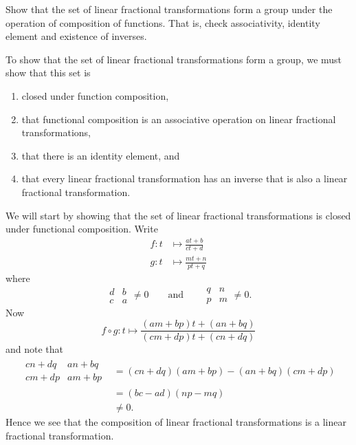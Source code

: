 \documentclass{ximera}
\begin{document}
\begin{problem}
Show that the set of linear fractional transformations form a group
under the operation of composition of functions. That is, check
associativity, identity element and existence of inverses.
\begin{freeResponse}
To show that the set of linear fractional transformations form a group, we must show that this set is 
\begin{enumerate}
\item closed under function composition, 
\item that functional composition is an associative operation on linear fractional transformations, 
\item that there is an identity element, and 
\item that every linear fractional transformation has an inverse that is also a linear fractional transformation. 
\end{enumerate}
We will start by showing that the set of linear fractional
transformations is closed under functional composition. Write
\begin{align*}
f:t &\mapsto\frac{at+b}{ct+d}\\
g:t &\mapsto\frac{mt+n}{pt+q}
\end{align*}
where
\[
\begin{array}{|cc|}
d & b\\
c& a
\end{array} \ne 0\qquad\text{and}\qquad
\begin{array}{|cc|}
q & n\\
p& m
\end{array} \ne 0.
\]
Now
\[
f\circ g : t \mapsto \frac{(am+bp)t+(an+bq)}{(cm+dp)t + (cn+dq)}
\]
and note that
\begin{align*}
\begin{array}{|cc|}
cn+dq & an+bq\\
cm+dp& am+bp
\end{array}  &= (cn+dq)(am+bp)- (an+bq)(cm+dp)\\
&= (bc - ad)(np-mq) \\
&\ne 0.
\end{align*}
Hence we see that the composition of linear fractional transformations
is a linear fractional transformation.  


\end{freeResponse}
\end{problem}
\end{document}
